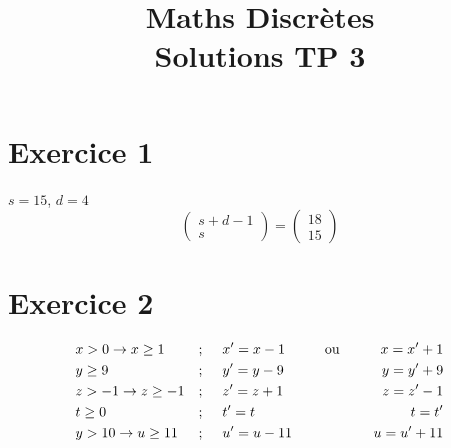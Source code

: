 \documentclass[fontsize=10pt]{article}
\title{\textbf{Maths Discrètes}\\ Solutions TP 3}
\date{}
\begin{document}
\maketitle %


\section*{Exercice 1}
$s = 15$, \hspace{1cm}$d = 4$\\
$$\begin{pmatrix}
s + d -1\\
s
\end{pmatrix}
=
\begin{pmatrix}
18\\
 15
\end{pmatrix}$$
\section*{Exercice 2}
\begin{align*}
&x > 0 \rightarrow x \geq 1 \hspace{0.5cm} &;\hspace{0.5cm}&x' = x-1 \hspace{1cm}\text{ou} \hspace{0.5cm}&x = x'+1 \\
&y \geq 9 &; \hspace{0.5cm}&y' = y-9 & y = y'+9\\
&z>-1 \rightarrow z\geq -1&; \hspace{0.5cm}&z' = z+1 & z = z'-1\\
&t \geq 0 &; \hspace{0.5cm}&t' = t & t = t'\\
&y > 10 \rightarrow u \geq 11 &; \hspace{0.5cm}&u' = u-11 & u = u' +11
\end{align*}
\end{document}
